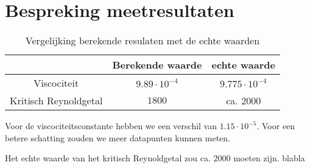 \section{Bespreking meetresultaten}

\begin{table}[H]
    \centering
    \label{tab:vergelijking}
    \caption{Vergelijking berekende resulaten met de echte waarden}
    \begin{tabular}{| c | c | c |}
        \hline
                                & Berekende waarde      & echte waarde          \\ \hline
        Viscociteit             & $9.89 \cdot 10^{-4}$  & $9.775 \cdot 10^{-4}$ \\ \hline
        Kritisch Reynoldgetal   & $1800$                & ca. $2000$            \\ \hline
    \end{tabular}
\end{table}
Voor de viscociteitsconstante hebben we een verschil van $1.15 \cdot 10^{-5}$.
Voor een betere schatting zouden we meer datapunten kunnen meten.

Het echte waarde van het kritisch Reynoldgetal zou ca. 2000 moeten zijn. blabla
